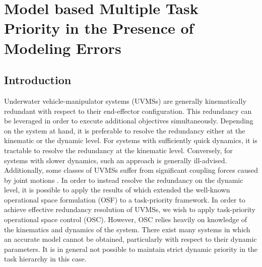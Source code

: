 \documentclass[../main.tex]{subfiles}
\begin{document}
\chapter{Model based Multiple Task Priority in the Presence of Modeling Errors}

\section{Introduction}
Underwater vehicle-manipulator systems (UVMSs) are generally kinematically redundant with respect to their end-effector configuration. This redundancy can be leveraged in order to execute additional objectives simultaneously. Depending on the system at hand, it is preferable to resolve the redundancy either at the kinematic or the dynamic level. For systems with sufficiently quick dynamics, it is tractable to resolve the redundancy at the kinematic level. Conversely, for systems with slower dynamics, such an approach is generally ill-advised. Additionally, some classes of UVMSs suffer from significant coupling forces caused by joint motions \citep{Borlaug2022}. In order to instead resolve the redundancy on the dynamic level, it is possible to apply the results of \cite{Khatib2004} which extended the well-known operational space formulation (OSF) \citep{Khatib1987} to a task-priority framework.
In order to achieve effective redundancy resolution of UVMSs, we wish to apply task-priority operational space control (OSC). However, OSC relies heavily on knowledge of the kinematics and dynamics of the system. There exist many systems in which an accurate model cannot be obtained, particularly with respect to their dynamic parameters. It is in general not possible to maintain strict dynamic priority in the task hierarchy in this case.%
\end{document}
